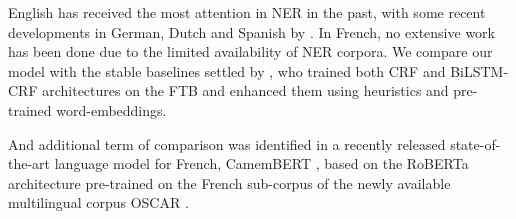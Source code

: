 
English has received the most attention in NER in the past, with some recent developments in German, Dutch and Spanish by \citet{strakova-etal-2019-neural}. In French, no extensive work has been done due to the limited availability of NER corpora. We compare our model with the stable baselines settled by \citep{dupont-2017-exploration}, who trained both CRF and BiLSTM-CRF architectures on the FTB and enhanced them using heuristics and pre-trained word-embeddings.

And additional term of comparison was identified in a recently released state-of-the-art language model for French, CamemBERT \citep{martin-etal-2020-camembert}, based on the RoBERTa architecture pre-trained on the French sub-corpus of the newly available multilingual corpus OSCAR \citep{ortiz-suarez-etal-2019-asynchronous}.



